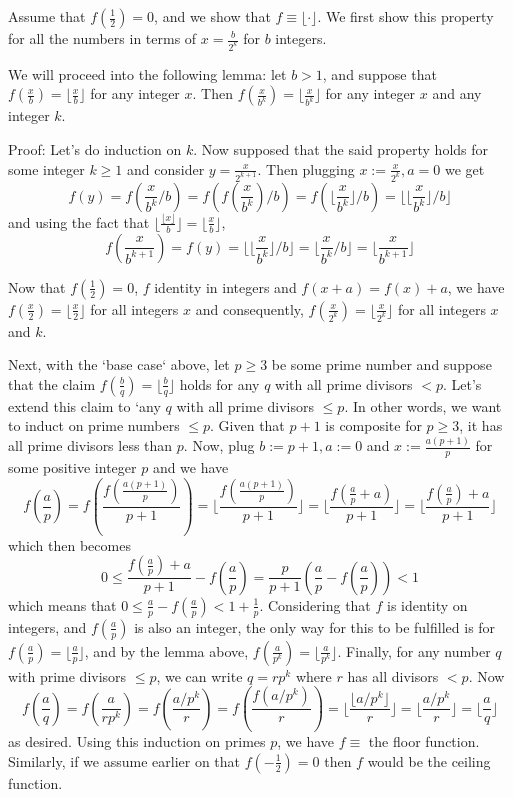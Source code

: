 \documentclass[11pt,a4paper]{article}
\begin{document}
\begin{enumerate}
		Assume that $f(\frac 12)=0$, and we show that $f\equiv \lfloor \cdot\rfloor$. 
		We first show this property for all the numbers in terms of $x=\frac{b}{2^k}$ for $b$ integers. 
		
		We will proceed into the following lemma: let $b>1$, and suppose that $f(\frac xb)=\lfloor\frac xb\rfloor$ for any integer $x$. Then $f(\frac x{b^k})=\lfloor\frac x{b^k}\rfloor$ for any integer $x$ and any integer $k$. 
		
		Proof: Let's do induction on $k$.  Now supposed that the said property holds for some integer $k\ge 1$ and consider $y=\frac{x}{2^{k+1}}$. Then plugging $x:=\frac{x}{2^k}, a=0$ we get
		\[
		f(y)=f(\frac{x}{b^k}/b)=f(f(\frac{x}{b^k})/b)=f(\lfloor\frac{x}{b^k}\rfloor/b)=\lfloor\lfloor\frac{x}{b^k}\rfloor/b\rfloor
		\]
		and using the fact that $\lfloor \frac{\lfloor x\rfloor}{b}\rfloor=\lfloor \frac{x}{b}\rfloor$, 
		\[
		f(\frac{x}{b^{k+1}})=f(y)=\lfloor\lfloor\frac{x}{b^k}\rfloor/b\rfloor=\lfloor\frac{x}{b^k}/b\rfloor
		=\lfloor\frac{x}{b^{k+1}}\rfloor
		\]
		
		Now that $f(\frac 12)=0$, $f$ identity in integers and $f(x+a)=f(x)+a$, we have $f(\frac{x}{2})=\lfloor \frac x2\rfloor$ for all integers $x$ and consequently, $f(\frac{x}{2^k})=\lfloor \frac x{2^k}\rfloor$ for all integers $x$ and $k$. 
		
		Next, with the `base case` above, let $p\ge 3$ be some prime number and suppose that the claim $f(\frac{b}{q})=\lfloor \frac{b}{q}\rfloor$ holds for any $q$ with all prime divisors $<p$. Let's extend this claim to `any $q$ with all prime divisors $\le p$. In other words, we want to induct on prime numbers $\le p$. Given that $p+1$ is composite for $p\ge 3$, it has all prime divisors less than $p$. Now, plug $b:=p + 1, a:=0$ and $x:= \frac{a(p+1)}{p}$ for some positive integer $p$ and we have 
		\[
		f(\frac{a}{p})=f(\frac{f(\frac{a(p+1)}{p})}{p+1})=\lfloor \frac{f(\frac{a(p+1)}{p})}{p+1}\rfloor
		= \lfloor \frac{f(\frac{a}{p}+a)}{p+1}\rfloor
		=\lfloor \frac{f(\frac{a}{p})+a}{p+1}\rfloor
		\]
		which then becomes 
		\[0\le \frac{f(\frac{a}{p})+a}{p+1} - f(\frac{a}{p})= \frac{p}{p+1}(\frac{a}{p}-f(\frac{a}{p}))< 1
		\]
		which means that $0\le \frac{a}{p}-f(\frac{a}{p})< 1+ \frac{1}{p}$. Considering that $f$ is identity on integers, and $f(\frac{a}{p})$ is also an integer, the only way for this to be fulfilled is for $f(\frac{a}{p})=\lfloor \frac{a}{p}\rfloor$, and by the lemma above, $f(\frac{a}{p^k})=\lfloor \frac{a}{p^k}\rfloor$. 
		Finally, for any number $q$ with prime divisors $\le p$, we can write $q=rp^k$ where $r$ has all divisors $<p$. Now 
		\[
		f(\frac{a}{q})
		=f(\frac{a}{rp^k})
		=f(\frac{a/p^k}{r})
		=f(\frac{f(a/p^k)}{r})
		=\lfloor\frac{\lfloor a/p^k\rfloor}{r}\rfloor
		=\lfloor\frac{a/p^k}{r}\rfloor
		=\lfloor\frac{a}{q}\rfloor
		\]
		as desired. Using this induction on primes $p$, we have $f\equiv $ the floor function. Similarly, if we assume earlier on that $f(-\frac 12)=0$ then $f$ would be the ceiling function. 
	 
\end{enumerate}
\end{document}
